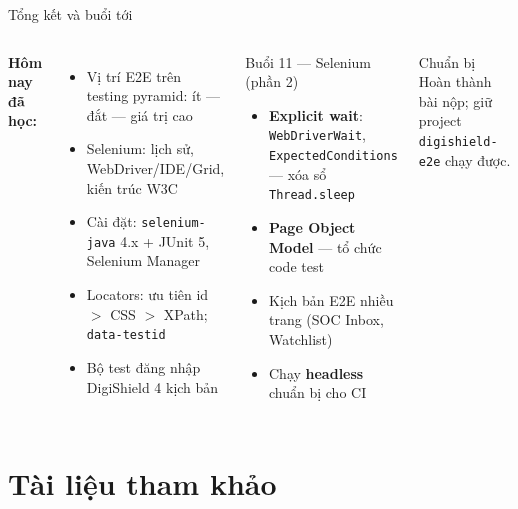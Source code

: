 \documentclass[aspectratio=169,12pt]{beamer}
\begin{document}
\begin{frame}{Tổng kết và buổi tới}
  \begin{columns}[T]
    \textbf{Hôm nay đã học:}
    \begin{itemize}
      \item Vị trí E2E trên testing pyramid: ít --- đắt --- giá trị cao
      \item Selenium: lịch sử, WebDriver/IDE/Grid, kiến trúc W3C
      \item Cài đặt: \texttt{selenium-java} 4.x + JUnit 5, Selenium Manager
      \item Locators: ưu tiên id \(>\) CSS \(>\) XPath; \texttt{data-testid}
      \item Bộ test đăng nhập DigiShield 4 kịch bản
    \end{itemize}

    \begin{block}{Buổi 11 --- Selenium (phần 2)}
      \begin{itemize}
        \item \textbf{Explicit wait}: \texttt{WebDriverWait}, \texttt{ExpectedConditions} --- xóa sổ \texttt{Thread.sleep}
        \item \textbf{Page Object Model} --- tổ chức code test
        \item Kịch bản E2E nhiều trang (SOC Inbox, Watchlist)
        \item Chạy \textbf{headless} chuẩn bị cho CI
      \end{itemize}
    \end{block}
    \begin{exampleblock}{Chuẩn bị}
      Hoàn thành bài nộp; giữ project \texttt{digishield-e2e} chạy được.
    \end{exampleblock}
  \end{columns}
\end{frame}

\section{Tài liệu tham khảo}
\end{document}
